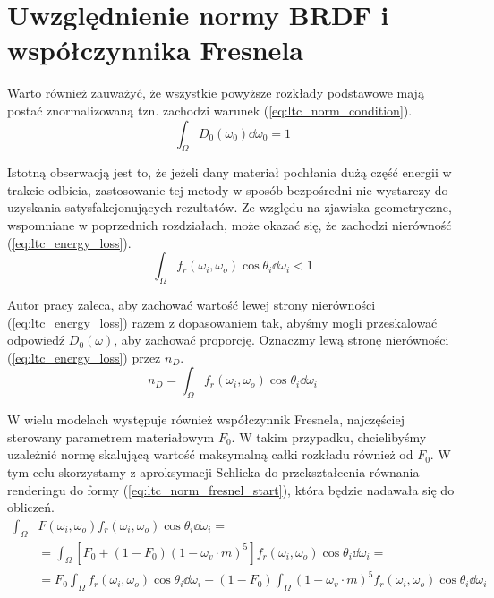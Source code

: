 \documentclass[../main.tex]{subfiles}
\begin{document}
\section{Uwzględnienie  normy BRDF i współczynnika Fresnela}

Warto również zauważyć, że wszystkie powyższe rozkłady podstawowe mają postać znormalizowaną tzn. zachodzi warunek (\ref{eq:ltc_norm_condition}).
\begin{equation}
\int_\Omega {
    D_0(\omega_0)
    \dd \omega_0
} = 1
\label{eq:ltc_norm_condition}
\end{equation}

Istotną obserwacją jest to, że jeżeli dany materiał pochłania dużą część energii w trakcie odbicia, zastosowanie tej metody w sposób bezpośredni nie wystarczy do uzyskania satysfakcjonujących rezultatów. Ze względu na zjawiska geometryczne, wspomniane w poprzednich rozdziałach, może okazać się, że zachodzi nierówność (\ref{eq:ltc_energy_loss}).
\begin{equation}
    \int_{\Omega} {
        f_r(\omega_i, \omega_o) \cos\theta_i 
        \dd \omega_i
    } < 1
\label{eq:ltc_energy_loss}
\end{equation}

Autor pracy \cite{LTCFresnelApprox} zaleca, aby zachować wartość lewej strony nierówności (\ref{eq:ltc_energy_loss}) razem z dopasowaniem tak, abyśmy mogli przeskalować odpowiedź $D_0(\omega)$, aby zachować proporcję. Oznaczmy lewą stronę nierówności (\ref{eq:ltc_energy_loss}) przez $n_D$.
\begin{equation}
n_D =
\int_{\Omega} {
    f_r(\omega_i, \omega_o) \cos\theta_i 
    \dd \omega_i
}
\label{eq:ltc_nd_def}
\end{equation}

W wielu modelach występuje również współczynnik Fresnela, najczęściej sterowany parametrem materiałowym $F_0$. W takim przypadku, chcielibyśmy uzależnić normę skalującą wartość maksymalną całki rozkładu również od $F_0$. W tym celu skorzystamy z aproksymacji Schlicka do przekształcenia równania renderingu do formy (\ref{eq:ltc_norm_fresnel_start}), która będzie nadawała się do obliczeń.
\begin{equation}
\begin{aligned}
\int_{\Omega} &{
    F(\omega_i, \omega_o)
    f_r(\omega_i, \omega_o) 
    \cos\theta_i 
    \dd \omega_i
} = \\
&= \int_{\Omega} {
    \left[
        F_0 + (1-F_0)(1 - \omega_v \cdot m)^5
    \right]
    f_r(\omega_i, \omega_o) 
    \cos\theta_i 
    \dd \omega_i
} = \\
&= F_0 \int_{\Omega} {
    f_r(\omega_i, \omega_o) 
    \cos\theta_i 
    \dd \omega_i
} + (1-F_0) \int_{\Omega} {
    (1 - \omega_v \cdot m)^5
    f_r(\omega_i, \omega_o) 
    \cos\theta_i 
    \dd \omega_i
}
\end{aligned}
\label{eq:ltc_norm_fresnel_start}
\end{equation}
\end{document}
